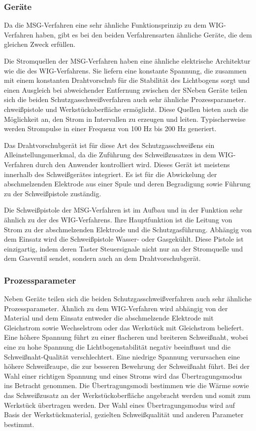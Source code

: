 \subsubsection{Geräte}
Da die MSG-Verfahren eine sehr ähnliche Funktionsprinzip zu dem WIG-Verfahren haben, gibt es bei den beiden Verfahrensarten ähnliche Geräte, die dem gleichen Zweck erfüllen.

Die Stromquellen der MSG-Verfahren haben eine ähnliche elektrische Architektur wie die des WIG-Verfahrens. Sie liefern eine konstante Spannung, die zusammen mit einem konstanten Drahtvorschub für die Stabilität des Lichtbogens sorgt und einen Ausgleich bei abweichender Entfernung zwischen der SNeben Geräte teilen sich die beiden Schutzgasschweißverfahren auch sehr ähnliche Prozessparameter. chweißpistole und Werkstückoberfläche ermöglicht. Diese Quellen bieten auch die Möglichkeit an, den Strom in Intervallen zu erzeugen und leiten. Typischerweise werden Strompulse in einer Frequenz von 100 Hz bis 200 Hz generiert. \autocite[38]{Pires_WeldingRobots_2006}

Das Drahtvorschubgerät ist für diese Art des Schutzgasschweißens ein Alleinstellungsmerkmal, da die Zuführung des Schweißzusatzes in dem WIG-Verfahren durch den Anwender kontrolliert wird. Dieses Gerät ist meistens innerhalb des Schweißgerätes integriert. Es ist für die Abwickelung der abschmelzenden Elektrode aus einer Spule und deren Begradigung sowie Führung zu der Schweißpistole zuständig. \autocite[39-40]{Pires_WeldingRobots_2006}

Die Schweißpistole der MSG-Verfahren ist im Aufbau und in der Funktion sehr ähnlich zu der des WIG-Verfahrens. Ihre Hauptfunktion ist die Leitung von Strom zu der abschmelzenden Elektrode und die Schutzgasführung. Abhängig von dem Einsatz wird die Schweißpistole Wasser- oder Gasgekühlt. Diese Pistole ist einzigartig, indem deren Taster Steuersignale nicht nur an der Stromquelle und dem Gasventil sendet, sondern auch an dem Drahtvorschubgerät. \autocite[40]{Pires_WeldingRobots_2006}

\subsubsection{Prozessparameter}
Neben Geräte teilen sich die beiden Schutzgasschweißverfahren auch sehr ähnliche Prozessparameter. Ähnlich zu dem WIG-Verfahren wird abhängig von der Material und dem Einsatz entweder die abschmelzende Elektrode mit Gleichstrom sowie Wechselstrom oder das Werkstück mit Gleichstrom beliefert. Eine höhere Spannung führt zu einer flacheren und breiteren Schweißnaht, wobei eine zu hohe Spannung die Lichtbogenstabilität negativ beeinflusst und die Schweißnaht-Qualität verschlechtert. Eine niedrige Spannung verursachen eine höhere Schweißraupe, die zur besseren Bewehrung der Schweißnaht führt. Bei der Wahl einer richtigen Spannung und eines Stroms wird das Übertragungsmodus ins Betracht genommen. Die Übertragungsmodi bestimmen wie die Wärme sowie das Schweißzusatz an der Werkstückoberfläche angebracht werden und somit zum Werkstück übertragen werden. Der Wahl eines Übertragungsmodus wird auf Basis der Werkstückmaterial, gezielten Schweißqualität und anderen Parameter bestimmt. \autocite[41-42]{Pires_WeldingRobots_2006}

